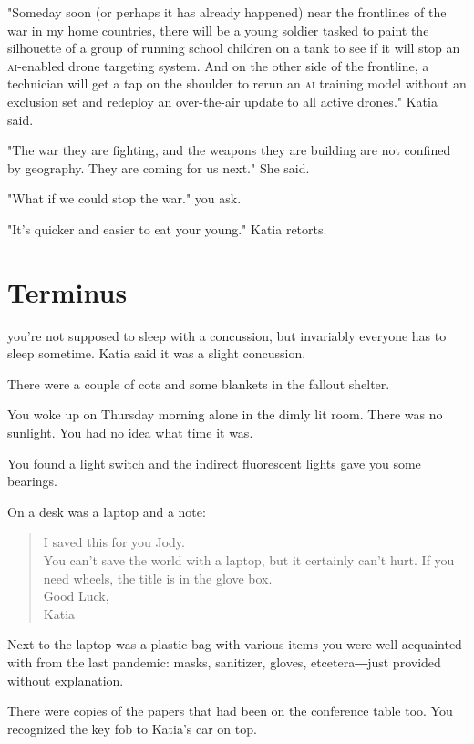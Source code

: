\documentclass[a5paper, symmetric]{tufte-book}
\begin{document}
"Someday soon (or perhaps it has already happened) near the frontlines of the war in my home countries, there will be a young soldier tasked to paint the silhouette of a group of running school children on a tank to see if it will stop an \textsc{ai}-enabled drone targeting system. And on the other side of the frontline, a technician will get a tap on the shoulder to rerun an \textsc{ai} training model without an exclusion set and redeploy an over-the-air update to all active drones." Katia said.

"The war they are fighting, and the weapons they are building are not confined by geography. They are coming for us next." She said. 

"What if we could stop the war." you ask. 

"It's quicker and easier to eat your young." Katia retorts. 

\chapter{Terminus}
\label{ch:thursday}


 you're not supposed to sleep with a concussion, but invariably everyone has to sleep sometime. Katia said it was a slight concussion.

There were a couple of cots and some blankets in the fallout shelter. 

You woke up on Thursday morning alone in the dimly lit room. There was no sunlight. You had no idea what time it was. 

You found a light switch and the indirect fluorescent lights gave you some bearings. 

On a desk was a laptop and a note:

\begin{quote} 
I saved this for you Jody. \\ You can't save the world with a laptop, but it certainly can't hurt. If you need wheels, the title is in the glove box. \\ Good Luck,\\
 Katia
\end{quote}

Next to the laptop was a plastic bag with various items you were well acquainted with from the last pandemic: masks, sanitizer, gloves, etcetera―just provided without explanation.

There were copies of the papers that had been on the conference table too. You recognized the key fob to Katia's car on top. 
\end{document}
